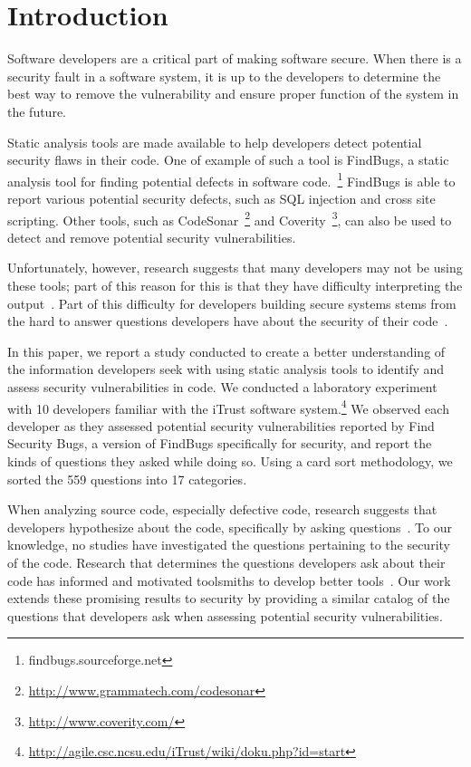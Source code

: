 \documentclass[conference]{IEEEtran}
\begin{document}
\section{Introduction}


Software developers are a critical part of making software secure. 
When there is a security fault in a software system, it is up to the developers to determine the best way to remove the vulnerability and ensure proper function of the system in the future.

Static analysis tools are made available to help developers detect potential security flaws in their code. One of example of such a tool is FindBugs, a static analysis tool for finding potential defects in software code.~\footnote{findbugs.sourceforge.net} FindBugs is able to report various potential security defects, such as SQL injection and cross site scripting.  %
Other tools, such as CodeSonar~\footnote{\url{http://www.grammatech.com/codesonar}} and Coverity~\footnote{\url{http://www.coverity.com/}}, can also be used to detect and remove potential security vulnerabilities.

Unfortunately, however, research suggests that many developers may not be using these tools; part of this reason for this is that they have difficulty interpreting the output~\cite{johnson2013don}. 
Part of this difficulty for developers building secure systems stems from the hard to answer questions developers have about the security of their code~\cite{latoza2010hard}.

In this paper, we report a study conducted to create a better understanding of the information developers seek with using static analysis tools to identify and assess security vulnerabilities in code.
We conducted a laboratory experiment with 10 developers familiar with the iTrust software system.\footnote{\url{http://agile.csc.ncsu.edu/iTrust/wiki/doku.php?id=start}} 
We observed each developer as they assessed potential security vulnerabilities reported by Find Security Bugs, a version of FindBugs specifically for security, and report the kinds of questions they asked while doing so.
Using a card sort methodology, we sorted the 559 questions into 17 categories. 

When analyzing source code, especially defective code, research suggests that developers hypothesize about the code, specifically by asking questions~\cite{livshits2005finding, ko2004designing}.
To our knowledge, no studies have investigated the questions pertaining to the security of the code. 
Research that determines the questions developers ask about their code has informed and motivated toolsmiths to develop better tools~\cite{kononenko2012automatically, servant2012history, yoon2013visualization}.
Our work extends these promising results to security by providing a similar catalog of the questions that developers ask when assessing potential security vulnerabilities.
\end{document}
